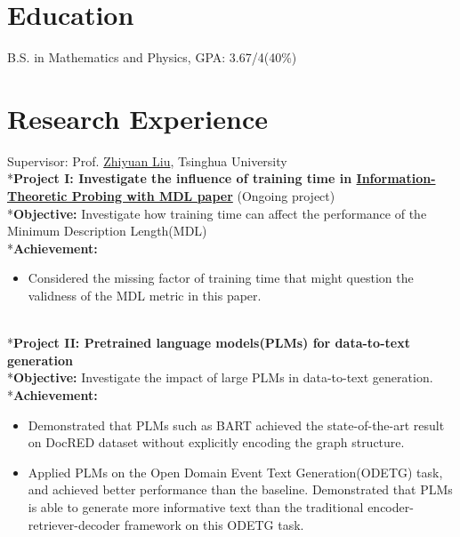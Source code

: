 \documentclass{resume}
\begin{document}



\section{Education}
B.S. in Mathematics and Physics, GPA: 3.67/4(40\%)


\section{Research Experience}
Supervisor: Prof. \href{http://nlp.csai.tsinghua.edu.cn/~lzy/}{Zhiyuan Liu}, Tsinghua University
\\*\textbf{Project I: Investigate the influence of training time in \href{https://lena-voita.github.io/posts/mdl_probes.html}{Information-Theoretic Probing with MDL paper}} (Ongoing project)
\\*\textbf{Objective:} Investigate how training time can affect the performance of the Minimum Description Length(MDL)
\\*\textbf{Achievement:}
\begin{itemize}
  \item Considered the missing factor of training time that might question the validness of the MDL metric in this paper.
\end{itemize}

\\*\textbf{Project II: Pretrained language models(PLMs) for data-to-text generation}
\\*\textbf{Objective:} Investigate the impact of large PLMs in data-to-text generation.
\\*\textbf{Achievement:}
\begin{itemize}
  \item Demonstrated that PLMs such as BART achieved the state-of-the-art result on DocRED dataset without explicitly encoding the graph structure.
  \item Applied PLMs on the Open Domain Event Text Generation(ODETG) task, and achieved better performance than the baseline. Demonstrated that PLMs is able to generate more informative text than the traditional encoder-retriever-decoder framework on this ODETG task.
\end{itemize}
\end{document}
